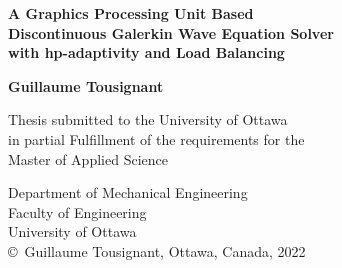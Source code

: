 \thispagestyle{empty}

\begin{titlepage}
	\begin{center}
		\vspace*{1cm} %
		
		{ \LARGE
			\textbf{A Graphics Processing Unit Based \\ 
				Discontinuous Galerkin Wave Equation Solver \\
				with hp-adaptivity and Load Balancing \\
			}
		}
		\vspace{1cm}

		
		{\large
			\textbf{Guillaume Tousignant}
		}
	
		\vspace{1cm}
	
		{\large
		Thesis submitted to the University of Ottawa \\
		in partial Fulfillment of the requirements for the \\
		}	
		\vspace{.3cm}
		{\Large
			Master of Applied Science \\
		}
		

		

		
		
		\vspace{3cm}
		Department of Mechanical Engineering \\
		Faculty of Engineering \\
		University of Ottawa \\
		\vfill
		\copyright\ Guillaume Tousignant, Ottawa, Canada, 2022
		
		
	\end{center}
\end{titlepage}
